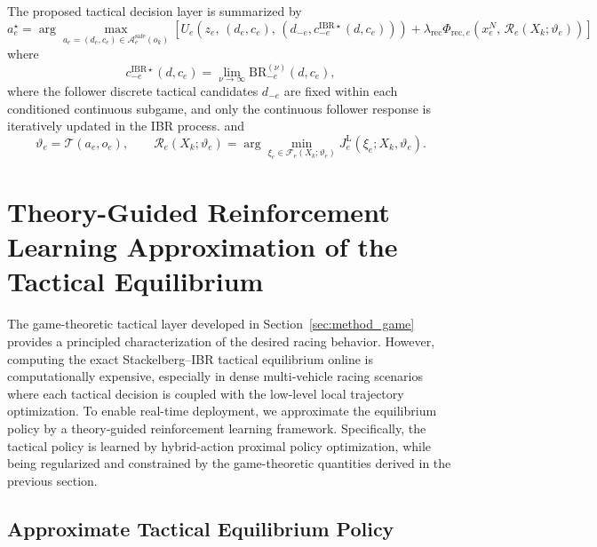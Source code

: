 \documentclass[final ,3p, times]{elsarticle}
\begin{document}
The proposed tactical decision layer is summarized by
\begin{equation}
\boxed{
a_e^\star
=
\arg\max_{a_e=(d_e,c_e)\in\mathcal{A}_e^{\mathrm{safe}}(o_k)}
\left[
U_e\!\left(
z_e,\,
(d_e,c_e),\,
(d_{-e},c_{-e}^{\mathrm{IBR}\star}(d,c_e))
\right)
+
\lambda_{\mathrm{rec}}
\Phi_{\mathrm{rec},e}
\left(
x_e^N,\,
\mathcal{R}_e(X_k;\vartheta_e)
\right)
\right]
}
\label{eq:compact_tactical_law}
\end{equation}
where
\begin{equation}
c_{-e}^{\mathrm{IBR}\star}(d,c_e)
=
\lim_{\nu\to\infty}
\mathrm{BR}_{-e}^{(\nu)}(d,c_e),
\label{eq:compact_ibr}
\end{equation}
where the follower discrete tactical candidates $d_{-e}$ are fixed within each conditioned continuous subgame, and only the continuous follower response is iteratively updated in the IBR process.
and
\begin{equation}
\vartheta_e = \mathcal{T}(a_e,o_e),
\qquad
\mathcal{R}_e(X_k;\vartheta_e)
=
\arg\min_{\xi_e\in\mathcal{F}_e(X_k;\vartheta_e)}
J_e^{\mathrm{L}}(\xi_e;X_k,\vartheta_e).
\label{eq:compact_lower_response}
\end{equation}

\section{Theory-Guided Reinforcement Learning Approximation of the Tactical Equilibrium}
\label{sec:theory_guided_rl}

The game-theoretic tactical layer developed in Section~\ref{sec:method_game} provides a principled characterization of the desired racing behavior. However, computing the exact Stackelberg--IBR tactical equilibrium online is computationally expensive, especially in dense multi-vehicle racing scenarios where each tactical decision is coupled with the low-level local trajectory optimization. To enable real-time deployment, we approximate the equilibrium policy by a theory-guided reinforcement learning framework. Specifically, the tactical policy is learned by hybrid-action proximal policy optimization, while being regularized and constrained by the game-theoretic quantities derived in the previous section.

\subsection{Approximate Tactical Equilibrium Policy}
\label{subsec:approx_equilibrium_policy}
\end{document}
